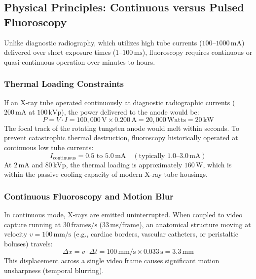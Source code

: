 \documentclass[11pt,a4paper]{article}
\begin{document}
\subsection{Physical Principles: Continuous versus Pulsed Fluoroscopy}

Unlike diagnostic radiography, which utilizes high tube currents ($100\text{--}1000\,\text{mA}$) delivered over short exposure times ($1\text{--}100\,\text{ms}$), fluoroscopy requires continuous or quasi-continuous operation over minutes to hours.

\subsubsection{Thermal Loading Constraints}
If an X-ray tube operated continuously at diagnostic radiographic currents ($200\,\text{mA}$ at $100\,\text{kVp}$), the power delivered to the anode would be:
\begin{equation}
    P = V \cdot I = 100{,}000\,\text{V} \times 0.200\,\text{A} = 20{,}000\,\text{Watts} = 20\,\text{kW}
\end{equation}
The focal track of the rotating tungsten anode would melt within seconds. To prevent catastrophic thermal destruction, fluoroscopy historically operated at continuous low tube currents:
\begin{equation}
    I_{\text{continuous}} = 0.5\text{ to }5.0\,\text{mA} \quad (\text{typically }1.0\text{--}3.0\,\text{mA})
\end{equation}
At $2\,\text{mA}$ and $80\,\text{kVp}$, the thermal loading is approximately $160\,\text{W}$, which is within the passive cooling capacity of modern X-ray tube housings.

\subsubsection{Continuous Fluoroscopy and Motion Blur}
In continuous mode, X-rays are emitted uninterrupted. When coupled to video capture running at $30\,\text{frames/s}$ ($33\,\text{ms/frame}$), an anatomical structure moving at velocity $v = 100\,\text{mm/s}$ (e.g., cardiac borders, vascular catheters, or peristaltic boluses) travels:
\begin{equation}
    \Delta x = v \cdot \Delta t = 100\,\text{mm/s} \times 0.033\,\text{s} = 3.3\,\text{mm}
\end{equation}
This displacement across a single video frame causes significant motion unsharpness (temporal blurring).
\end{document}
